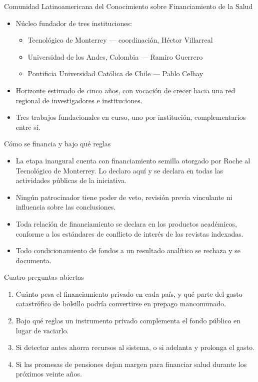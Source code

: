 \documentclass[aspectratio=169,11pt]{beamer}
\begin{document}
\begin{frame}{Comunidad Latinoamericana del Conocimiento sobre Financiamiento de la Salud}
  \small
  \begin{itemize}
    \item Núcleo fundador de tres instituciones:
      \begin{itemize}
        \item Tecnológico de Monterrey — coordinación, Héctor Villarreal
        \item Universidad de los Andes, Colombia — Ramiro Guerrero
        \item Pontificia Universidad Católica de Chile — Pablo Celhay
      \end{itemize}
    \item Horizonte estimado de cinco años, con vocación de crecer hacia una red regional de investigadores e instituciones.
    \item Tres trabajos fundacionales en curso, uno por institución, complementarios entre sí.
  \end{itemize}
\end{frame}

\begin{frame}{Cómo se financia y bajo qué reglas}
  \small
  \begin{itemize}
    \item La etapa inaugural cuenta con financiamiento semilla otorgado por Roche al Tecnológico de Monterrey. Lo declaro aquí y se declara en todas las actividades públicas de la iniciativa.
    \item Ningún patrocinador tiene poder de veto, revisión previa vinculante ni influencia sobre las conclusiones.
    \item Toda relación de financiamiento se declara en los productos académicos, conforme a los estándares de conflicto de interés de las revistas indexadas.
    \item Todo condicionamiento de fondos a un resultado analítico se rechaza y se documenta.
  \end{itemize}
\end{frame}

\begin{frame}{Cuatro preguntas abiertas}
  \begin{enumerate}
    \item Cuánto pesa el financiamiento privado en cada país, y qué parte del gasto catastrófico de bolsillo podría convertirse en prepago mancomunado.
    \item Bajo qué reglas un instrumento privado complementa el fondo público en lugar de vaciarlo.
    \item Si detectar antes ahorra recursos al sistema, o si adelanta y prolonga el gasto.
    \item Si las promesas de pensiones dejan margen para financiar salud durante los próximos veinte años.
  \end{enumerate}
\end{frame}
\end{document}
